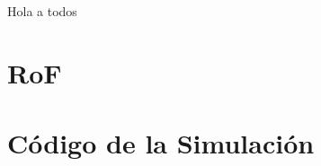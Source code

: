 Hola a todos

	\section{RoF}
		\label{Mdl:RoF}
	

	\section{Código de la Simulación}
		\label{Mdl:Code}
	
		
	
